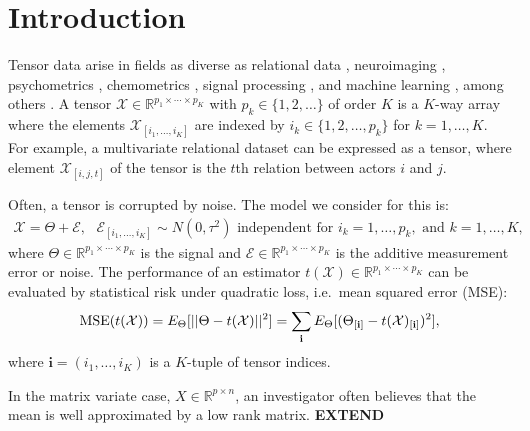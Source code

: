 \section{Introduction}
\label{sec:intro}

Tensor data arise in fields as diverse as relational data
\citep{hoff2015multilinear}, neuroimaging
\citep{zhang2014tensor,li2016parsimonious}, psychometrics
\citep{kiers2001three}, chemometrics
\citep{smilde2005multi,bro2006review}, signal processing
\citep{cichocki2015tensor}, and machine learning
\citep{tao2005supervised}, among others
\citep{kroonenberg2008applied}.
A tensor $\mathcal{X} \in \mathbb{R}^{p_1\times\cdots\times p_K}$ with
$p_k \in \{1,2,\ldots\}$ of order $K$ is a $K$-way array where the
elements $\mathcal{X}_{[i_1,\ldots,i_K]}$ are indexed by $i_k \in
\{1,2,\ldots,p_k\}$ for $k = 1,\ldots,K$. For example, a multivariate
relational dataset can be expressed as a tensor, where element
$\mathcal{X}_{[i,j,t]}$ of the tensor is the $t$th relation between
actors $i$ and $j$.

Often, a tensor is corrupted by noise. The model we consider for this
is:
\begin{align}
  \label{equation:normal.model}
  \mathcal{X} = \Theta + \mathcal{E},\text{  } \mathcal{E}_{[i_1,\ldots,i_K]} \sim N(0,\tau^2) \text{ independent for } i_k = 1,\ldots,p_k, \text{ and } k = 1,\ldots,K,
\end{align}
where $\Theta \in \mathbb{R}^{p_1\times\cdots\times p_K}$ is the
signal and $\mathcal{E} \in \mathbb{R}^{p_1\times\cdots\times p_K}$ is
the additive measurement error or noise. The performance of an
estimator $t(\mathcal{X})\in \mathbb{R}^{p_1\times\cdots\times p_K}$
can be evaluated by statistical risk under quadratic loss, i.e.\ mean
squared error (MSE):
\begin{align}
  \label{equation:mse}
  \operatorname*{MSE}(t(\mathcal{X})) = E_{\Theta}[||\Theta - t(\mathcal{X})||^2] = \sum_{\mathbf{i}} E_{\Theta}[(\Theta_{[\mathbf{i}]} - t(\mathcal{X})_{[\mathbf{i}]})^2],
\end{align}
where $\mathbf{i} = (i_1,\ldots,i_K)$ is a $K$-tuple of tensor
indices.

In the matrix variate case, $X \in \mathbb{R}^{p \times n}$, an
investigator often believes that the mean is well approximated by a
low rank matrix. \textbf{EXTEND}

